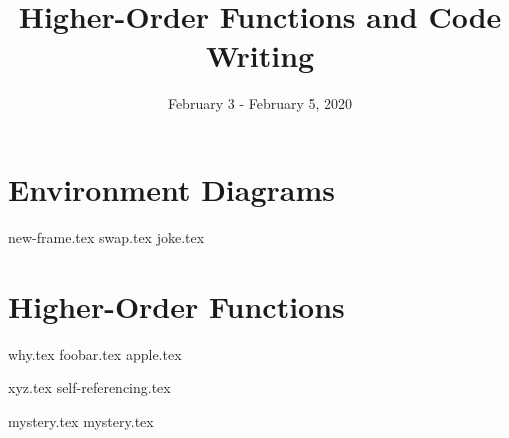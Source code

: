 \documentclass{exam}
\title{Higher-Order Functions and Code Writing}
\date{February 3 - February 5, 2020}
\begin{document}
\maketitle

\section{Environment Diagrams}
\begin{questions}
{new-frame.tex}
{swap.tex}
\newpage
{joke.tex}
\end{questions}

\section{Higher-Order Functions}
\begin{questions}
{why.tex}
{foobar.tex}
{apple.tex}

\newpage
{xyz.tex}
{self-referencing.tex}

\newpage
{mystery.tex}
{mystery.tex}
\clearpage

\end{questions}
\end{document}
